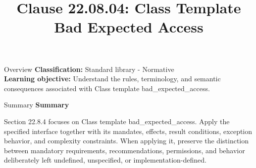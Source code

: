 \documentclass[10pt,letterpaper]{article}
\title{Clause 22.08.04: Class Template Bad Expected Access}
\author{}
\date{}
\begin{document}
\maketitle
\begin{CornellOverviewBox}{Overview}
\textbf{Classification:} Standard library - Normative\\[2pt]
\textbf{Learning objective:} Understand the rules, terminology, and semantic consequences associated with Class template bad\_expected\_access.
\end{CornellOverviewBox}\begin{CornellSummaryBox}{Summary}
{\sffamily\bfseries\color{Accent} Summary}\par\vspace{3pt}Section 22.8.4 focuses on Class template bad\_expected\_access. Apply the specified interface together with its mandates, effects, result conditions, exception behavior, and complexity constraints. When applying it, preserve the distinction between mandatory requirements, recommendations, permissions, and behavior deliberately left undefined, unspecified, or implementation-defined.
\end{CornellSummaryBox}
\end{document}
